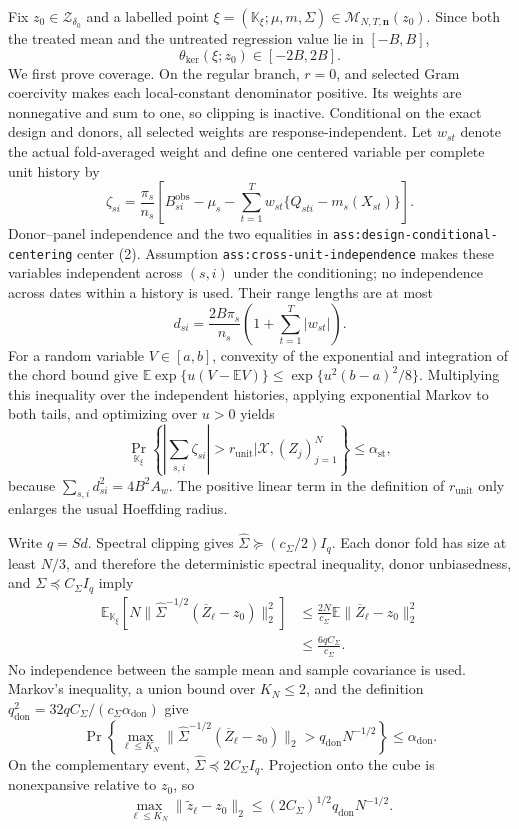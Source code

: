 Fix \(z_0\in\mathcal Z_{\delta_0}\) and a labelled point
\(\xi=(\mathbb K_\xi;\mu,m,\Sigma)\in
\mathcal M_{N,T,\mathbf n}(z_0)\).  Since both the treated mean and the untreated regression value lie in \([-B,B]\),
\[
 \theta_{\mathrm{ker}}(\xi;z_0)\in[-2B,2B].                 \tag{1}
\]
We first prove coverage.  On the regular branch, \(r=0\), and selected Gram coercivity makes each local-constant denominator positive.  Its weights are nonnegative and sum to one, so clipping is inactive.  Conditional on the exact design and donors, all selected weights are response-independent.  Let \(w_{st}\) denote the actual fold-averaged weight and define one centered variable per complete unit history by
\[
 \zeta_{si}=\frac{\pi_s}{n_s}\left[
 B_{si}^{\mathrm{obs}}-\mu_s-
 \sum_{t=1}^{T}w_{st}\{Q_{sti}-m_s(X_{st})\}\right].       \tag{2}
\]
Donor--panel independence and the two equalities in \texttt{ass:design-conditional-centering} center (2).  Assumption \texttt{ass:cross-unit-independence} makes these variables independent across \((s,i)\) under the conditioning; no independence across dates within a history is used.  Their range lengths are at most
\[
 d_{si}=\frac{2B\pi_s}{n_s}
 \left(1+\sum_{t=1}^{T}|w_{st}|\right).                    \tag{3}
\]
For a random variable \(V\in[a,b]\), convexity of the exponential and integration of the chord bound give
\(\mathbb E\exp\{u(V-\mathbb EV)\}\le
\exp\{u^2(b-a)^2/8\}\).  Multiplying this inequality over the independent histories, applying exponential Markov to both tails, and optimizing over \(u>0\) yields
\[
 \Pr_{\mathbb K_\xi}\!\left\{
 \left|\sum_{s,i}\zeta_{si}\right|>r_{\mathrm{unit}}
 \mathrel{\Big|}\mathcal X,(Z_j)_{j=1}^{N}\right\}
 \le\alpha_{\mathrm{st}},                                  \tag{4}
\]
because \(\sum_{s,i}d_{si}^2=4B^2A_w\).  The positive linear term in the definition of \(r_{\mathrm{unit}}\) only enlarges the usual Hoeffding radius.

Write \(q=Sd\).  Spectral clipping gives
\(\widehat\Sigma\succeq(c_\Sigma/2)I_q\).  Each donor fold has size at least \(N/3\), and therefore the deterministic spectral inequality, donor unbiasedness, and \(\Sigma\preceq C_\Sigma I_q\) imply
\[
\begin{aligned}
 \mathbb E_{\mathbb K_\xi}\!\left[
 N\|\widehat\Sigma^{-1/2}(\overline Z_\ell-z_0)\|_2^2
 \right]
 &\le \frac{2N}{c_\Sigma}
       \mathbb E\|\overline Z_\ell-z_0\|_2^2\\
 &\le\frac{6qC_\Sigma}{c_\Sigma}.
\end{aligned}                                               \tag{5}
\]
No independence between the sample mean and sample covariance is used.  Markov's inequality, a union bound over \(K_N\le2\), and the definition
\(q_{\mathrm{don}}^2=32qC_\Sigma/(c_\Sigma\alpha_{\mathrm{don}})\) give
\[
 \Pr\left\{
 \max_{\ell\le K_N}\|\widehat\Sigma^{-1/2}
 (\overline Z_\ell-z_0)\|_2>
 q_{\mathrm{don}}N^{-1/2}\right\}
 \le\alpha_{\mathrm{don}}.                                 \tag{6}
\]
On the complementary event, \(\widehat\Sigma\preceq2C_\Sigma I_q\).  Projection onto the cube is nonexpansive relative to \(z_0\), so
\[
 \max_{\ell\le K_N}\|\widetilde z_\ell-z_0\|_2
 \le(2C_\Sigma)^{1/2}q_{\mathrm{don}}N^{-1/2}.             \tag{7}
\]

